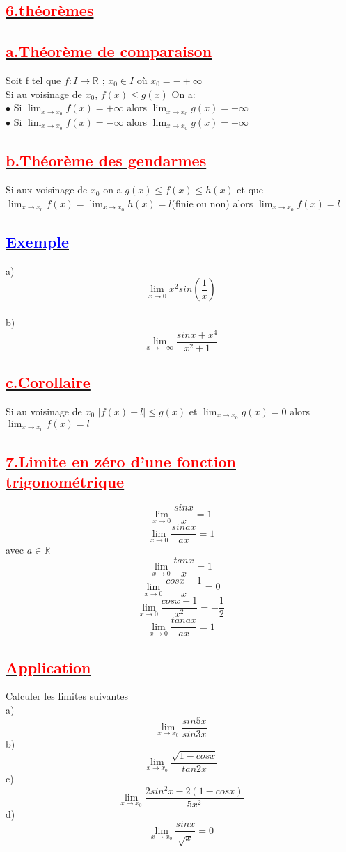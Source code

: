 \documentclass[12pt]{article}
\begin{document}
\subsection*{\underline{\textbf{\textcolor{red}{6.théorèmes}}}}
\subsection*{\underline{\textbf{\textcolor{red}{a.Théorème de comparaison}}}}
Soit f tel que $f:I\longrightarrow \mathbb{R}$ ; $x_{0} \in I$ où $x_{0}=-+\infty$\\
Si au voisinage de $x_{0}$, $f(x)\leq g(x)$ On a:\\
$\bullet$ Si  $\lim_{x \to x_{0}}f(x)=+\infty$ alors $\lim_{x \to x_{0}}g(x)=+\infty$\\
$\bullet$ Si  $\lim_{x \to x_{0}}f(x)=-\infty$ alors $\lim_{x \to x_{0}}g(x)=-\infty$
\subsection*{\underline{\textbf{\textcolor{red}{b.Théorème des gendarmes}}}}
Si aux voisinage de $x_{0}$ on a $g(x) \leq f(x) \leq h(x)$ et que 
$\lim_{x \to x_{0}}f(x)=\lim_{x \to x_{0}}h(x)=l$(finie ou non) alors $\lim_{x \to x_{0}}f(x)=l$
\subsection*{\underline{\textbf{\textcolor{blue}{Exemple}}}}
a)\[\lim_{x \to 0} x^{2} sin(\frac{1}{x})\]\\
b)\[\lim_{x \to +\infty} \frac{sinx + x^{4}}{x^{2}+1}\]
\subsection*{\underline{\textbf{\textcolor{red}{c.Corollaire}}}}
Si au voisinage de $x_{0}$ $|f(x)-l| \leq g(x)$ et $\lim_{x \to x_{0}}g(x)=0$ alors \\
$\lim_{x \to x_{0}}f(x)=l$
\subsection*{\underline{\textbf{\textcolor{red}{7.Limite en zéro d'une fonction trigonométrique}}}}
\[\lim_{x \to 0} \frac{sinx}{x} = 1\]
\[\lim_{x \to 0} \frac{sinax}{ax} = 1\] avec $a\in\mathbb{R}$
\[\lim_{x \to 0} \frac{tanx}{x} = 1\]
\[\lim_{x \to 0} \frac{cosx-1}{x} = 0\]
\[\lim_{x \to 0} \frac{cosx-1}{x^{2}} = -\frac{1}{2}\]
\[\lim_{x \to 0} \frac{tanax}{ax} = 1\]
\subsection*{\underline{\textbf{\textcolor{red}{Application}}}}
Calculer les limites suivantes\\
a)\[\lim_{x \to x_{0}} \frac{sin5x}{sin3x}\]
b)\[\lim_{x \to x_{0}} \frac{\sqrt{1-cosx}}{tan2x}\]
c)\[\lim_{x \to x_{0}} \frac{2sin^{2}x-2(1-cosx)}{5x^{2}}\]
d)\[\lim_{x \to x_{0}} \frac{sinx}{\sqrt{x}} = 0\]
\end{document}
